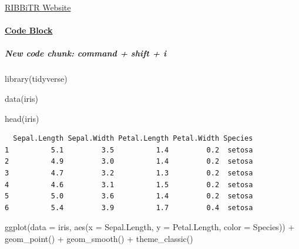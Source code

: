\documentclass[
  letterpaper,
  DIV=11,
  numbers=noendperiod]{scrartcl}
\let\oldparagraph\paragraph
\renewcommand{\paragraph}[1]{\oldparagraph{#1}\mbox{}}
\let\oldsubparagraph\subparagraph
\renewcommand{\subparagraph}[1]{\oldsubparagraph{#1}\mbox{}}
\newenvironment{Shaded}{\begin{snugshade}}{\end{snugshade}}
\newcommand{\AttributeTok}[1]{\textcolor[rgb]{0.40,0.45,0.13}{#1}}
\newcommand{\FunctionTok}[1]{\textcolor[rgb]{0.28,0.35,0.67}{#1}}
\newcommand{\NormalTok}[1]{\textcolor[rgb]{0.00,0.23,0.31}{#1}}
\newcommand{\SpecialCharTok}[1]{\textcolor[rgb]{0.37,0.37,0.37}{#1}}
\begin{document}
\href{https://ribbitr.com/}{RIBBiTR Website}

\hypertarget{code-block}{%
\paragraph{\texorpdfstring{\ul{Code
Block}}{Code Block}}\label{code-block}}

\hypertarget{new-code-chunk-command-shift-i}{%
\subparagraph{New code chunk: command + shift +
i}\label{new-code-chunk-command-shift-i}}

\begin{Shaded}
\begin{Highlighting}[]
\FunctionTok{library}\NormalTok{(tidyverse)}

\FunctionTok{data}\NormalTok{(iris)}

\FunctionTok{head}\NormalTok{(iris)}
\end{Highlighting}
\end{Shaded}

\begin{verbatim}
  Sepal.Length Sepal.Width Petal.Length Petal.Width Species
1          5.1         3.5          1.4         0.2  setosa
2          4.9         3.0          1.4         0.2  setosa
3          4.7         3.2          1.3         0.2  setosa
4          4.6         3.1          1.5         0.2  setosa
5          5.0         3.6          1.4         0.2  setosa
6          5.4         3.9          1.7         0.4  setosa
\end{verbatim}

\begin{Shaded}
\begin{Highlighting}[]
\FunctionTok{ggplot}\NormalTok{(}\AttributeTok{data =}\NormalTok{ iris, }\FunctionTok{aes}\NormalTok{(}\AttributeTok{x =}\NormalTok{ Sepal.Length, }\AttributeTok{y =}\NormalTok{ Petal.Length, }\AttributeTok{color =}\NormalTok{ Species)) }\SpecialCharTok{+}
  \FunctionTok{geom\_point}\NormalTok{() }\SpecialCharTok{+}
  \FunctionTok{geom\_smooth}\NormalTok{() }\SpecialCharTok{+}
  \FunctionTok{theme\_classic}\NormalTok{()}
\end{Highlighting}
\end{Shaded}
\end{document}
